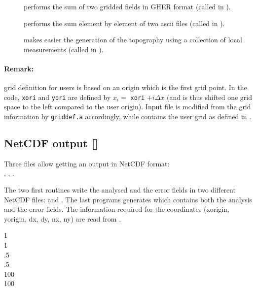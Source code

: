 \begin{description}
\item[] performs the sum of two gridded fields in GHER format (called in ).

\item[] performs the sum element by element of two ascii files (called in ).

\item[] makes easier the generation of the topography using a collection of local measurements (called in ).

\end{description}

\paragraph{Remark:} grid definition for users is based on an origin which is the first grid point. 
In the code, \texttt{xori} and \texttt{yori} are defined by $x_i=$ \texttt{xori} $+i \Delta x$ (and is thus shifted one grid space to the left compared to the user origin). Input file  is modified from the  grid information by \texttt{griddef.a} accordingly, while  contains the user grid as defined in .


\subsection[NetCDF output]{NetCDF output []}


Three files allow getting an output in NetCDF format:\\ 
, , . 

The two first routines write the analysed and the error fields in two different NetCDF files:  and . The last programs generates  which contains both the analysis and the error fields. The information required for the coordinates (xorigin, yorigin, dx, dy, nx, ny) are read from .

\begin{exfile}[H]
1\\
1\\
.5\\
 .5\\
100\\
100
\caption{}
\end{exfile}


